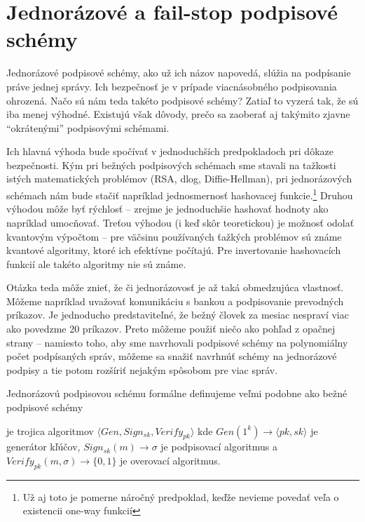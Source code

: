 \section{Jednorázové a fail-stop podpisové schémy}

Jednorázové podpisové schémy, ako už ich názov napovedá, slúžia na
podpísanie práve jednej správy. Ich bezpečnosť je v prípade viacnásobného
podpisovania ohrozená. Načo sú nám teda takéto podpisové schémy? Zatiaľ to
vyzerá tak, že sú iba menej výhodné. Existujú však dôvody, prečo sa zaoberať
aj takýmito zjavne ``okrátenými'' podpisovými schémami.

Ich hlavná výhoda bude spočívať v jednoduchších predpokladoch pri dôkaze
bezpečnosti. Kým pri bežných podpisových schémach sme stavali na
tažkosti istých matematických problémov (RSA, dlog, Diffie-Hellman),
pri jednorázových schémach nám bude stačiť napríklad jednosmernosť
hashovacej funkcie.\footnote{Už aj toto je pomerne náročný predpoklad,
    keďže nevieme povedať veľa o existencii one-way funkcií}
Druhou výhodou môže byť rýchlosť -- zrejme je jednoduchšie hashovať hodnoty
ako napríklad umocňovať.
Treťou výhodou (i keď skôr teoretickou) je možnosť odolať kvantovým
výpočtom -- pre väčsinu používaných ťažkých problémov sú známe kvantové
algoritmy, ktoré ich efektívne počítajú. Pre invertovanie hashovacích
funkcií ale takéto algoritmy nie sú známe.

Otázka teda môže znieť, že či jednorázovosť je až taká obmedzujúca
vlastnosť. Môžeme napríklad uvažovať komunikáciu s bankou a podpisovanie
prevodných príkazov. Je jednoducho predstaviteľné, že
bežný človek za mesiac nespraví viac ako povedzme 20 príkazov.
Preto môžeme použiť
niečo ako pohľad z opačnej strany -- namiesto toho, aby sme navrhovali
podpisové schémy na polynomiálny počet podpísaných správ,
môžeme sa snažiť navrhnúť schémy na jednorázové podpisy a tie potom
rozšíriť nejakým spôsobom pre viac správ.

Jednorázovú podpisovou schému formálne definujeme veľmi podobne ako bežné
podpisové schémy

\begin{definicia}
    je trojica algoritmov 
    $\langle Gen, Sign_{sk}, Verify_{pk} \rangle$ kde
    $Gen(1^k) \rightarrow \langle pk, sk \rangle$ je generátor kľúčov,
    $Sign_{sk}(m) \rightarrow \sigma$ je podpisovací algoritmus a
    $Verify_{pk}(m,\sigma) \rightarrow \{0,1\}$ je overovací algoritmus.
\end{definicia}

